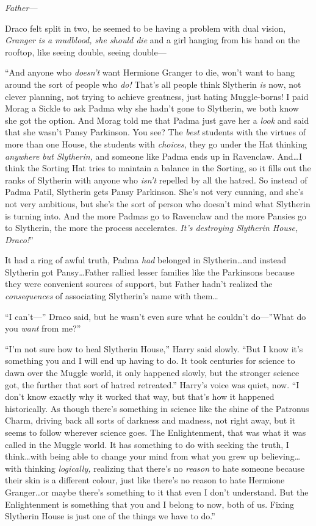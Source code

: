 \emph{Father—}

Draco felt split in two, he seemed to be having a problem with dual vision, \emph{Granger is a mudblood, she should die} and a girl hanging from his hand on the rooftop, like seeing double, seeing double—

“And anyone who \emph{doesn’t} want Hermione Granger to die, won’t want to hang around the sort of people who \emph{do!} That’s all people think Slytherin \emph{is} now, not clever planning, not trying to achieve greatness, just hating Muggle-borns! I paid Morag a Sickle to ask Padma why she hadn’t gone to Slytherin, we both know she got the option. And Morag told me that Padma just gave her a \emph{look} and said that she wasn’t Pansy Parkinson. You see? The \emph{best} students with the virtues of more than one House, the students with \emph{choices,} they go under the Hat thinking \emph{anywhere but Slytherin,} and someone like Padma ends up in Ravenclaw. And…I think the Sorting Hat tries to maintain a balance in the Sorting, so it fills out the ranks of Slytherin with anyone who \emph{isn’t} repelled by all the hatred. So instead of Padma Patil, Slytherin gets Pansy Parkinson. She’s not very cunning, and she’s not very ambitious, but she’s the sort of person who doesn’t mind what Slytherin is turning into. And the more Padmas go to Ravenclaw and the more Pansies go to Slytherin, the more the process accelerates. \emph{It’s destroying Slytherin House, Draco!}”

It had a ring of awful truth, Padma \emph{had} belonged in Slytherin…and instead Slytherin got Pansy…Father rallied lesser families like the Parkinsons because they were convenient sources of support, but Father hadn’t realized the \emph{consequences} of associating Slytherin’s name with them…

“I can’t—” Draco said, but he wasn’t even sure what he couldn’t do—”What do you \emph{want} from me?”

“I’m not sure how to heal Slytherin House,” Harry said slowly. “But I know it’s something you and I will end up having to do. It took centuries for science to dawn over the Muggle world, it only happened slowly, but the stronger science got, the further that sort of hatred retreated.” Harry’s voice was quiet, now. “I don’t know exactly why it worked that way, but that’s how it happened historically. As though there’s something in science like the shine of the Patronus Charm, driving back all sorts of darkness and madness, not right away, but it seems to follow wherever science goes. The Enlightenment, that was what it was called in the Muggle world. It has something to do with seeking the truth, I think…with being able to change your mind from what you grew up believing…with thinking \emph{logically,} realizing that there’s no \emph{reason} to hate someone because their skin is a different colour, just like there’s no reason to hate Hermione Granger…or maybe there’s something to it that even I don’t understand. But the Enlightenment is something that you and I belong to now, both of us. Fixing Slytherin House is just one of the things we have to do.”

